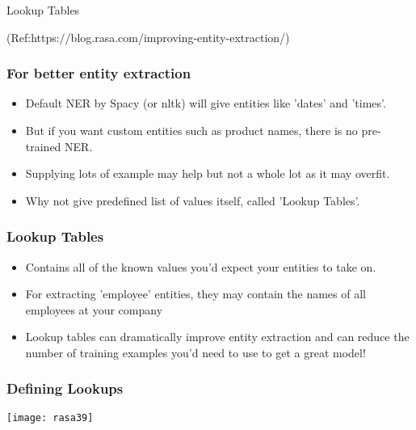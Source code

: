 \begin{frame}[fragile]\frametitle{}
\begin{center}
{\Large Lookup Tables}

{\tiny (Ref:https://blog.rasa.com/improving-entity-extraction/)}
\end{center}
\end{frame}


 \begin{frame}[fragile]\frametitle{For better entity extraction}
\begin{itemize}
\item Default NER by Spacy (or nltk) will give entities like 'dates' and 'times'.
\item But if you want custom entities such as product names, there is no pre-trained NER.
\item Supplying lots of example may help but not a whole lot as it may overfit.
\item Why not give predefined list of values itself, called 'Lookup Tables'.
\end{itemize}


\end{frame}

 \begin{frame}[fragile]\frametitle{Lookup Tables}
\begin{itemize}
\item Contains all of the known values you'd expect your entities to take on.
\item For extracting 'employee' entities, they may contain the names of all employees at your company
\item Lookup tables can dramatically improve entity extraction and can reduce the number of training examples you'd need to use to get a great model!
\end{itemize}


\end{frame}

 \begin{frame}[fragile]\frametitle{Defining Lookups}
\begin{center}
\texttt{[image: rasa39]}
\end{center}
\end{frame}

